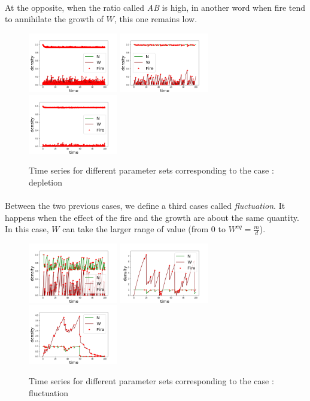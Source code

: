 \documentclass{article}
\begin{document}
\paragraph{}
At the opposite, when the ratio called \textit{AB} is high, in another word when fire tend to annihilate the growth of $W$, this one remains low.
\begin{figure}[h!]
\centering
\includegraphics[width=3.9cm]{continue_1.png}
\includegraphics[width=3.9cm]{continue_2.png}
\includegraphics[width=3.9cm]{continue_3.png}
\caption{Time series for different parameter sets corresponding to the case : depletion}
\end{figure}


\paragraph{}
Between the two previous cases, we define a third cases called \textit{fluctuation}. It happens when the effect of the fire and the growth are about the same quantity. In this case, $W$ can take the larger range of value (from $0$ to $W^{eq}=\frac{m}{d}$).
\begin{figure}[h!]
\centering
\includegraphics[width=3.9cm]{middle_1.png}
\includegraphics[width=3.9cm]{middle_2.png}
\includegraphics[width=3.9cm]{middle_3.png}
\caption{Time series for different parameter sets corresponding to the case : fluctuation}
\end{figure}
\end{document}
